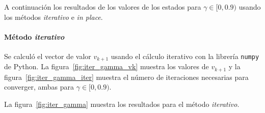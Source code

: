 A continuación los resultados de los valores de los estados para $\gamma \in [0, 0.9)$ usando los métodos \textit{iterativo} e \textit{in place}.

\paragraph{Método \textit{iterativo}} Se calculó el vector de valor $v_{k+1}$ usando el cálculo iterativo con la librería \texttt{numpy} de Python\footnotemark.
La figura~\ref{fig:iter_gamma_vk} muestra los valores de $v_{k+1}$ y la figura~\ref{fig:iter_gamma_iter} muestra el número de iteraciones necesarias para converger, ambas para $\gamma \in [0, 0.9)$.


La figura~\ref{fig:iter_gamma} muestra los resultados para el método \textit{iterativo}.

